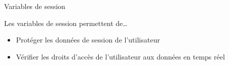 \begin{frame}{Variables de session}

  Les variables de session permettent de\dots
  \begin{itemize}
  \item Protéger les données de session de l'utilisateur
  \item Vérifier les droits d'accès de l'utilisateur aux données en temps réel
  \end{itemize}
\end{frame}